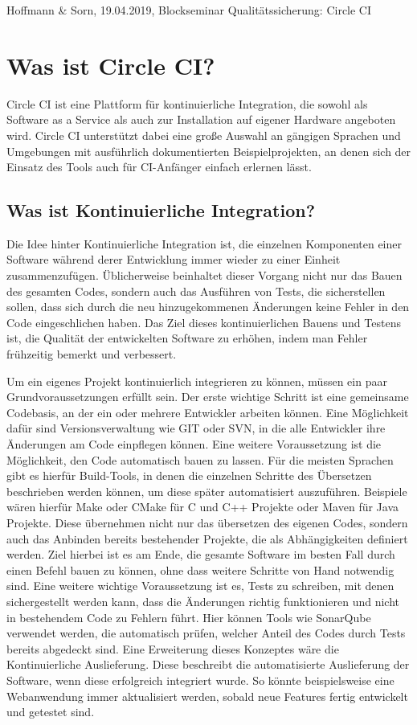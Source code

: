 \documentclass[11pt]{article}
\begin{document}
Hoffmann \& Sorn, 19.04.2019, Blockseminar Qualitätssicherung: Circle CI

\tableofcontents
\newpage

\section {Was ist Circle CI?}

Circle CI ist eine Plattform für kontinuierliche Integration, die sowohl als Software as a Service als auch zur Installation auf eigener Hardware angeboten wird. Circle CI unterstützt dabei eine große Auswahl an gängigen Sprachen und Umgebungen mit ausführlich dokumentierten Beispielprojekten, an denen sich der Einsatz des Tools auch für CI-Anfänger einfach erlernen lässt.

\subsection {Was ist Kontinuierliche Integration?}

Die Idee hinter Kontinuierliche Integration ist, die einzelnen Komponenten einer Software während derer Entwicklung immer wieder zu einer Einheit zusammenzufügen. Üblicherweise beinhaltet dieser Vorgang nicht nur das Bauen des gesamten Codes, sondern auch das Ausführen von Tests, die sicherstellen sollen, dass sich durch die neu hinzugekommenen Änderungen keine Fehler in den Code eingeschlichen haben. Das Ziel dieses kontinuierlichen Bauens und Testens ist, die Qualität der entwickelten Software zu erhöhen, indem man Fehler frühzeitig bemerkt und verbessert.

Um ein eigenes Projekt kontinuierlich integrieren zu können, müssen ein paar Grundvoraussetzungen erfüllt sein. Der erste wichtige Schritt ist eine gemeinsame Codebasis, an der ein oder mehrere Entwickler arbeiten können. Eine Möglichkeit dafür sind Versionsverwaltung wie GIT oder SVN, in die alle Entwickler ihre Änderungen am Code einpflegen können. Eine weitere Voraussetzung ist die Möglichkeit, den Code automatisch bauen zu lassen. Für die meisten Sprachen gibt es hierfür Build-Tools, in denen die einzelnen Schritte des Übersetzen beschrieben werden können, um diese später automatisiert auszuführen. Beispiele wären hierfür Make oder CMake für C und C++ Projekte oder Maven für Java Projekte. Diese übernehmen nicht nur das übersetzen des eigenen Codes, sondern auch das Anbinden bereits bestehender Projekte, die als Abhängigkeiten definiert werden. Ziel hierbei ist es am Ende, die gesamte Software im besten Fall durch einen Befehl bauen zu können, ohne dass weitere Schritte von Hand notwendig sind. Eine weitere wichtige Voraussetzung ist es, Tests zu schreiben, mit denen sichergestellt werden kann, dass die Änderungen richtig funktionieren und nicht in bestehendem Code zu Fehlern führt. Hier können Tools wie SonarQube verwendet werden, die automatisch prüfen, welcher Anteil des Codes durch Tests bereits abgedeckt sind. Eine Erweiterung dieses Konzeptes wäre die Kontinuierliche Auslieferung. Diese beschreibt die automatisierte Auslieferung der Software, wenn diese erfolgreich integriert wurde. So könnte beispielsweise eine Webanwendung immer aktualisiert werden, sobald neue Features fertig entwickelt und getestet sind.
\end{document}
